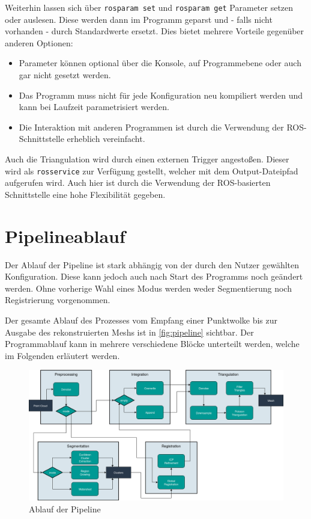 Weiterhin lassen sich über \texttt{rosparam set} und \texttt{rosparam get} Parameter setzen oder auslesen.
Diese werden dann im Programm geparst und - falls nicht vorhanden - durch Standardwerte ersetzt.
Dies bietet mehrere Vorteile gegenüber anderen Optionen:

\begin{itemize}
\item Parameter können optional über die Konsole, auf Programmebene oder auch gar nicht gesetzt werden.
\item Das Programm muss nicht für jede Konfiguration neu kompiliert werden und kann bei Laufzeit parametrisiert werden.
\item Die Interaktion mit anderen Programmen ist durch die Verwendung der \ac{ROS}-Schnittstelle erheblich vereinfacht.
\end{itemize}

Auch die Triangulation wird durch einen externen Trigger angestoßen.
Dieser wird als \texttt{rosservice} zur Verfügung gestellt, welcher mit dem Output-Dateipfad aufgerufen wird.
Auch hier ist durch die Verwendung der \ac{ROS}-basierten Schnittstelle eine hohe Flexibilität gegeben.


\section{Pipelineablauf}
\label{sec:pipeline}

Der Ablauf der Pipeline ist stark abhängig von der durch den Nutzer gewählten Konfiguration.
Diese kann jedoch auch nach Start des Programms noch geändert werden.
Ohne vorherige Wahl eines Modus werden weder Segmentierung noch Registrierung vorgenommen.

Der gesamte Ablauf des Prozesses vom Empfang einer Punktwolke bis zur Ausgabe des rekonstruierten Meshs ist in \autoref{fig:pipeline} sichtbar.
Der Programmablauf kann in mehrere verschiedene Blöcke unterteilt werden, welche im Folgenden erläutert werden.

\begin{figure}[ht]
    \centering
	\includegraphics[width=\textwidth]{images/pipeline.png}
	\caption{Ablauf der Pipeline}
	\label{fig:pipeline}
\end{figure}


